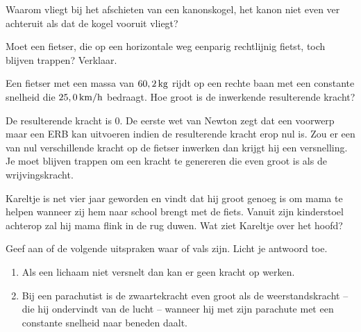 \begin{exercise} Waarom vliegt bij het afschieten van een kanonskogel, het kanon niet even ver achteruit als dat de kogel vooruit vliegt?


\end{exercise}

\begin{exercise} Moet een fietser, die op een horizontale weg eenparig rechtlijnig fietst, toch blijven trappen? Verklaar.

\end{exercise}

\begin{exercise} Een fietser met een massa van $60,2\rm\,kg$ rijdt op een rechte baan met een constante snelheid die $25,0\rm\,km/h$ bedraagt. Hoe groot is de inwerkende resulterende kracht? 
\begin{oplossing}
De resulterende kracht is 0. De eerste wet van Newton zegt dat een voorwerp maar een ERB kan uitvoeren indien de resulterende kracht erop nul is. Zou er een van nul verschillende kracht op de fietser inwerken dan krijgt hij een versnelling. Je moet blijven trappen om een kracht te genereren die even groot is als de wrijvingskracht.
\end{oplossing}

\end{exercise}

\begin{exercise} Kareltje is net vier jaar geworden en vindt dat hij groot genoeg is om mama te helpen wanneer zij hem naar school brengt met de fiets. Vanuit zijn kinderstoel achterop zal hij mama flink in de rug duwen. Wat ziet Kareltje over het hoofd? 

\end{exercise}

\begin{exercise} Geef aan of de volgende uitspraken waar of vals zijn. Licht je antwoord toe.
\begin{enumerate}
\item Als een lichaam niet versnelt dan kan er geen kracht op werken. 
\item Bij een parachutist is de zwaartekracht even groot als de weerstandskracht -- die hij ondervindt van de lucht -- wanneer hij met zijn parachute met een constante snelheid naar beneden daalt. 
\end{enumerate}


\end{exercise}


